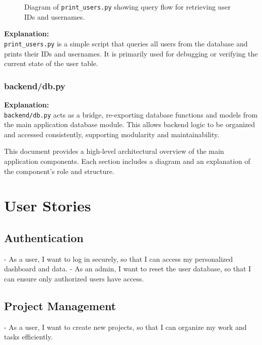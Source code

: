 \documentclass{report}
\begin{document}
\begin{figure}[h]
    \caption{Diagram of \texttt{print\_users.py} showing query flow for retrieving user IDs and usernames.}
\end{figure}

\noindent
\textbf{Explanation:} \\
\texttt{print\_users.py} is a simple script that queries all users from the database and prints their IDs and usernames. It is primarily used for debugging or verifying the current state of the user table.

\subsection{backend/db.py}


\noindent
\textbf{Explanation:} \\
\texttt{backend/db.py} acts as a bridge, re-exporting database functions and models from the main application database module. This allows backend logic to be organized and accessed consistently, supporting modularity and maintainability.



This document provides a high-level architectural overview of the main application components. Each section includes a diagram and an explanation of the component's role and structure.
\chapter{User Stories}
\section{Authentication}

- As a user, I want to log in securely, so that I can access my personalized dashboard and data.
- As an admin, I want to reset the user database, so that I can ensure only authorized users have access.

\section{Project Management}
- As a user, I want to create new projects, so that I can organize my work and tasks efficiently.
\end{document}
